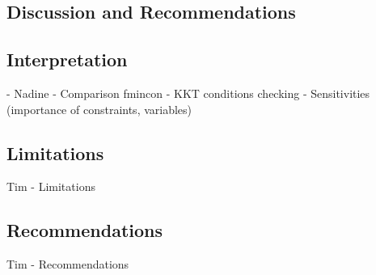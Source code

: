 \subsection{Discussion and Recommendations}
\subsection{Interpretation}
- Nadine
- Comparison fmincon
- KKT conditions checking
- Sensitivities (importance of constraints, variables)

\subsection{Limitations}
Tim
- Limitations

\subsection{Recommendations}
Tim
- Recommendations